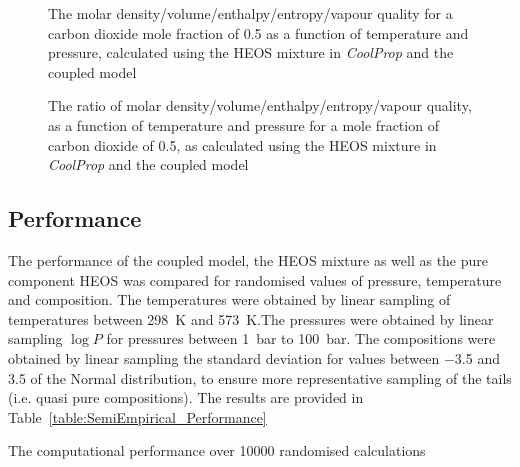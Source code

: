     \begin{figure}[H]
        \centering
        
        \caption{The molar density/volume/enthalpy/entropy/vapour quality for a carbon dioxide mole fraction of \num{0.5} as a function of temperature and pressure, calculated using the \ac{HEOS} mixture in \emph{CoolProp} and the coupled model}
        \label{fig:SemiEmpirical_properties_maintext}
    \end{figure}

    \begin{figure}[H]
        \centering
        
        \caption{The ratio of molar density/volume/enthalpy/entropy/vapour quality, as a function of temperature and pressure for a mole fraction of carbon dioxide of \num{0.5}, as calculated using the \ac{HEOS} mixture in \emph{CoolProp} and the coupled model}
        \label{fig:SemiEmpirical_ratios_maintext}
    \end{figure}

\subsection{Performance}
\label{sec:SemiEmpirical_performance}
    The performance of the coupled model, the \ac{HEOS} mixture as well as the pure component \ac{HEOS} was compared for randomised values of pressure, temperature and composition. The temperatures were obtained by linear sampling of temperatures between \qty{298}{\K} and \qty{573}{\K}.The pressures were obtained by linear sampling \(\log P\) for pressures between \qty{1}{\bar} to \qty{100}{\bar}. The compositions were obtained by linear sampling the standard deviation for values between \num{-3.5} and \num{+3.5} of the Normal distribution, to ensure more representative sampling of the tails (i.e. quasi pure compositions). The results are provided in Table~\ref{table:SemiEmpirical_Performance}

    \begin{table}[H]
        \caption{The computational performance over 10000 randomised calculations}
        \centering 
        \label{table:SemiEmpirical_Performance}
            
        \\[10pt]
    \end{table}




